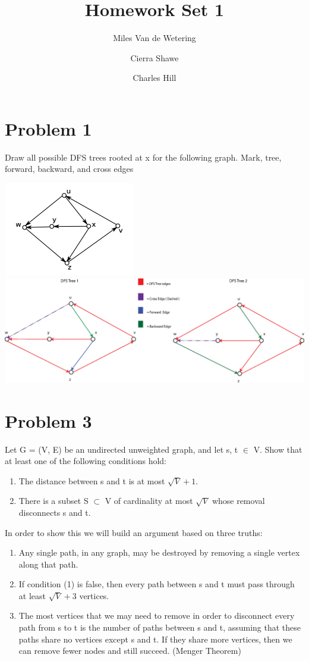 \documentclass[]{report}
\title{Homework Set 1}
\author{Miles Van de Wetering
	\and
	Cierra Shawe
	\and
	Charles Hill}
\begin{document}
\maketitle

\section*{Problem 1}
Draw all possible DFS trees rooted at x for the following graph. Mark, tree, forward,
backward, and cross edges
\begin{center}
	\includegraphics[]{hw1_p1_graph.png}
	\includegraphics[scale=0.5]{cs420-hw2}
\end{center}

\section*{Problem 3}
Let G = (V, E) be an undirected unweighted graph, and let s, t $\in$ V. Show that at least one of the following conditions hold:
\begin{enumerate}
	\item The distance between s and t is at most $\sqrt{V} + 1$.
	\item There is a subset S $\subset$ V of cardinality at most $\sqrt{V}$ whose removal disconnects s and t.
\end{enumerate}

In order to show this we will build an argument based on three truths:
\begin{enumerate}
	\item Any single path, in any graph, may be destroyed by removing a single vertex along that path.
	\item If condition (1) is false, then every path  between s and t must pass through at least $\sqrt{V} + 3$ vertices.
	\item The most vertices that we may need to remove in order to disconnect every path from s to t is the number of paths between s and t, assuming that these paths share no vertices except s and t. If they share more vertices, then we can remove fewer nodes and still succeed. (Menger Theorem)
\end{enumerate}
	\smallskip
	
\end{document}
